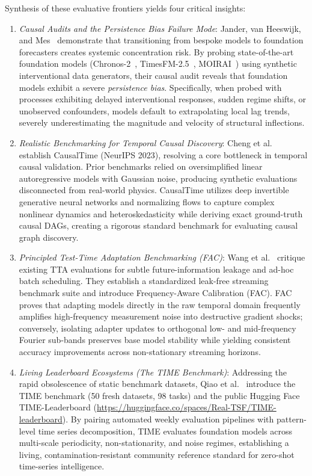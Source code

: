 Synthesis of these evaluative frontiers yields four critical insights:
\begin{enumerate}[leftmargin=*]
    \item \emph{Causal Audits and the Persistence Bias Failure Mode}: Jander, van Heeswijk, and Mes~\cite{jander2026causal} demonstrate that transitioning from bespoke models to foundation forecasters creates systemic concentration risk. By probing state-of-the-art foundation models (Chronos-2~\cite{ansari2025chronos2}, TimesFM-2.5~\cite{das2024timesfm}, MOIRAI~\cite{woo2024moirai}) using synthetic interventional data generators, their causal audit reveals that foundation models exhibit a severe \emph{persistence bias}. Specifically, when probed with processes exhibiting delayed interventional responses, sudden regime shifts, or unobserved confounders, models default to extrapolating local lag trends, severely underestimating the magnitude and velocity of structural inflections.
    \item \emph{Realistic Benchmarking for Temporal Causal Discovery}: Cheng et al.~\cite{cheng2023causaltime} establish CausalTime (NeurIPS 2023), resolving a core bottleneck in temporal causal validation. Prior benchmarks relied on oversimplified linear autoregressive models with Gaussian noise, producing synthetic evaluations disconnected from real-world physics. CausalTime utilizes deep invertible generative neural networks and normalizing flows to capture complex nonlinear dynamics and heteroskedasticity while deriving exact ground-truth causal DAGs, creating a rigorous standard benchmark for evaluating causal graph discovery.
    \item \emph{Principled Test-Time Adaptation Benchmarking (FAC)}: Wang et al.~\cite{wang2026principled} critique existing TTA evaluations for subtle future-information leakage and ad-hoc batch scheduling. They establish a standardized leak-free streaming benchmark suite and introduce Frequency-Aware Calibration (FAC). FAC proves that adapting models directly in the raw temporal domain frequently amplifies high-frequency measurement noise into destructive gradient shocks; conversely, isolating adapter updates to orthogonal low- and mid-frequency Fourier sub-bands preserves base model stability while yielding consistent accuracy improvements across non-stationary streaming horizons.
    \item \emph{Living Leaderboard Ecosystems (The TIME Benchmark)}: Addressing the rapid obsolescence of static benchmark datasets, Qiao et al.~\cite{qiao2026time} introduce the TIME benchmark (50 fresh datasets, 98 tasks) and the public Hugging Face TIME-Leaderboard (\url{https://huggingface.co/spaces/Real-TSF/TIME-leaderboard}). By pairing automated weekly evaluation pipelines with pattern-level time series decomposition, TIME evaluates foundation models across multi-scale periodicity, non-stationarity, and noise regimes, establishing a living, contamination-resistant community reference standard for zero-shot time-series intelligence.
\end{enumerate}


